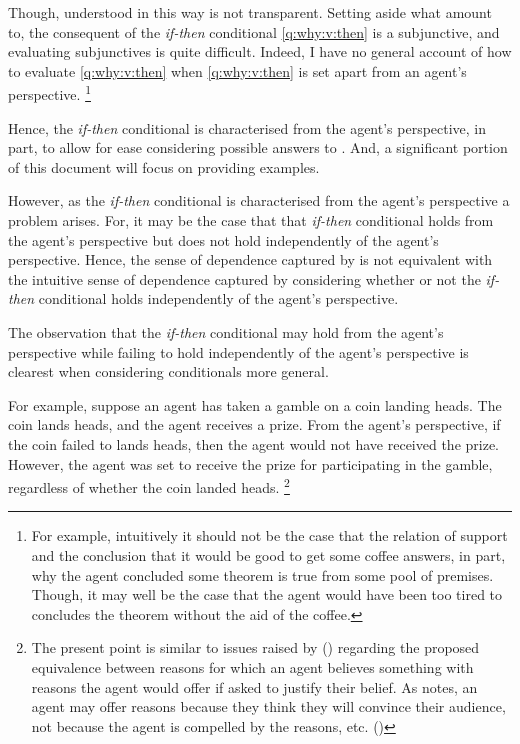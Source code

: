 \begin{note}
  Though, \qWhyV{} understood in this way is not transparent.
  Setting aside what  amount to, the consequent of the \emph{if-then} conditional \ref{q:why:v:then} is a subjunctive, and evaluating subjunctives is quite difficult.
  Indeed, I have no general account of how to evaluate \ref{q:why:v:then} when \ref{q:why:v:then} is set apart from an agent's perspective.%
  \footnote{
    For example, intuitively it should not be the case that the relation of support and the conclusion that it would be good to get some coffee answers, in part, why the agent concluded some theorem is true from some pool of premises.
    Though, it may well be the case that the agent would have been too tired to concludes the theorem without the aid of the coffee.
  }

  Hence, the \emph{if-then} conditional is characterised from the agent's perspective, in part, to allow for ease considering possible answers to \qWhyV{}.
  And, a significant portion of this document will focus on providing examples.

  However, as the \emph{if-then} conditional is characterised from the agent's perspective a problem arises.
  For, it may be the case that that \emph{if-then} conditional holds from the agent's perspective but does not hold independently of the agent's perspective.
  Hence, the sense of dependence captured by \qWhyV{} is not equivalent with the intuitive sense of dependence captured by considering whether or not the \emph{if-then} conditional holds independently of the agent's perspective.

  The observation that the \emph{if-then} conditional may hold from the agent's perspective while failing to hold independently of the agent's perspective is clearest when considering conditionals more general.

  For example, suppose an agent has taken a gamble on a coin landing heads.
  The coin lands heads, and the agent receives a prize.
  From the agent's perspective, if the coin failed to lands heads, then the agent would not have received the prize.
  However, the agent was set to receive the prize for participating in the gamble, regardless of whether the coin landed heads.%
  \footnote{
    The present point is similar to issues raised by \citeauthor{Harman:1973ww} (\citeyear{Harman:1973ww}) regarding the proposed equivalence between reasons for which an agent believes something with reasons the agent would offer if asked to justify their belief.
  As \citeauthor{Harman:1973ww} notes, an agent may offer reasons because they think they will convince their audience, not because the agent is compelled by the reasons, etc.
  (\citeyear[Ch.2]{Harman:1973ww})

}
\end{note}
